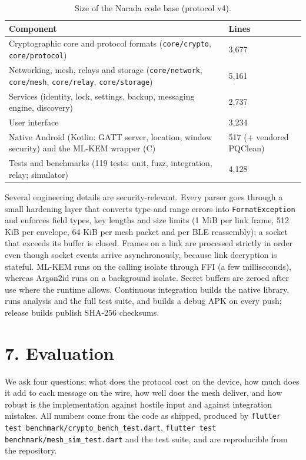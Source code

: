 \documentclass[conference]{IEEEtran}
\begin{document}
\begin{table}[t]\centering\footnotesize
\caption{Size of the Narada code base (protocol v4).}
\begin{tabular}{ll}\toprule
Component & Lines \\ \midrule
Cryptographic core and protocol formats (\texttt{core/crypto}, \texttt{core/protocol}) & 3,677 \\
Networking, mesh, relays and storage (\texttt{core/network}, \texttt{core/mesh}, \texttt{core/relay}, \texttt{core/storage}) & 5,161 \\
Services (identity, lock, settings, backup, messaging engine, discovery) & 2,737 \\
User interface & 3,234 \\
Native Android (Kotlin: GATT server, location, window security) and the ML-KEM wrapper (C) & 517 (+ vendored PQClean) \\
Tests and benchmarks (119 tests: unit, fuzz, integration, relay; simulator) & 4,128 \\
\bottomrule\end{tabular}\end{table}
Several engineering details are security-relevant. Every parser goes through a small hardening layer that converts type and range errors into \texttt{FormatException} and enforces field types, key lengths and size limits (1 MiB per link frame, 512 KiB per envelope, 64 KiB per mesh packet and per BLE reassembly); a socket that exceeds its buffer is closed. Frames on a link are processed strictly in order even though socket events arrive asynchronously, because link decryption is stateful. ML-KEM runs on the calling isolate through FFI (a few milliseconds), whereas Argon2id runs on a background isolate. Secret buffers are zeroed after use where the runtime allows. Continuous integration builds the native library, runs analysis and the full test suite, and builds a debug APK on every push; release builds publish SHA-256 checksums.

\section{7. Evaluation}
We ask four questions: what does the protocol cost on the device, how much does it add to each message on the wire, how well does the mesh deliver, and how robust is the implementation against hostile input and against integration mistakes. All numbers come from the code as shipped, produced by \texttt{flutter test benchmark/crypto\_bench\_test.dart}, \texttt{flutter test benchmark/mesh\_sim\_test.dart} and the test suite, and are reproducible from the repository.
\end{document}
